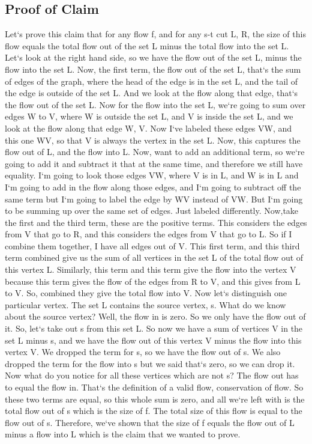 \subsection{Proof of Claim}
Let`s prove this claim that for any flow f, and for any s-t cut L, R, the size of this flow equals the total flow out of the set L minus the total flow into the set L\@.
Let`s look at the right hand side, so we have the flow out of the set L, minus the flow into the set L\@.
Now, the first term, the flow out of the set L, that`s the sum of edges of the graph, where the head of the edge is in the set L, and the tail of the edge is outside of the set L\@.
And we look at the flow along that edge, that`s the flow out of the set L\@.
Now for the flow into the set L, we`re going to sum over edges W to V, where W is outside the set L, and V is inside the set L, and we look at the flow along that edge W, V\@.
Now I`ve labeled these edges VW, and this one WV, so that V is always the vertex in the set L\@.
Now, this captures the flow out of L, and the flow into L\@.
Now, want to add an additional term, so we`re going to add it and subtract it that at the same time, and therefore we still have equality.
I`m going to look those edges VW, where V is in L, and W is in L and I`m going to add in the flow along those edges, and I`m going to subtract off the same term but I`m going to label the edge by WV instead of VW\@.
But I`m going to be summing up over the same set of edges.
Just labeled differently.
Now,take the first and the third term, these are the positive terms.
This considers the edges from V that go to R, and this considers the edges from V that go to L\@.
So if I combine them together, I have all edges out of V\@.
This first term, and this third term combined give us the sum of all vertices in the set L of the total flow out of this vertex L\@.
Similarly, this term and this term give the flow into the vertex V because this term gives the flow of the edges from R to V, and this gives from L to V\@.
So, combined they give the total flow into V\@.
Now let`s distinguish one particular vertex.
The set L contains the source vertex, s.
What do we know about the source vertex? Well, the flow in is zero.
So we only have the flow out of it.
So, let`s take out s from this set L\@.
So now we have a sum of vertices V in the set L minus s, and we have the flow out of this vertex V minus the flow into this vertex V\@.
We dropped the term for s, so we have the flow out of s.
We also dropped the term for the flow into s but we said that`s zero, so we can drop it.
Now what do you notice for all these vertices which are not s? The flow out has to equal the flow in.
That`s the definition of a valid flow, conservation of flow.
So these two terms are equal, so this whole sum is zero, and all we`re left with is the total flow out of s which is the size of f.
The total size of this flow is equal to the flow out of s.
Therefore, we`ve shown that the size of f equals the flow out of L minus a flow into L which is the claim that we wanted to prove.

